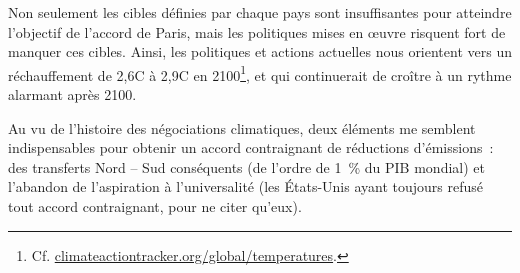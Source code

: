 \documentclass[a5paper,french,openany]{memoir}
\begin{document}
Non seulement les cibles définies par chaque pays sont insuffisantes pour atteindre l'objectif de l'accord de Paris, mais les politiques mises en œuvre risquent fort de manquer ces cibles. Ainsi, les politiques et actions actuelles nous orientent vers un réchauffement de 2,6\textdegree{}C à 2,9\textdegree{}C en 2100\footnote{Cf. \href{https://climateactiontracker.org/global/temperatures/}{climateactiontracker.org/global/temperatures}.}, et qui continuerait de croître à un rythme alarmant après 2100. 

Au vu de l'histoire des négociations climatiques, deux éléments me semblent indispensables pour obtenir un accord contraignant de réductions d'émissions~: des transferts Nord -- Sud conséquents (de l'ordre de 1~\% du PIB mondial) et l'abandon de l'aspiration à l'universalité (les États-Unis ayant toujours refusé tout accord contraignant, pour ne citer qu'eux).
\end{document}
